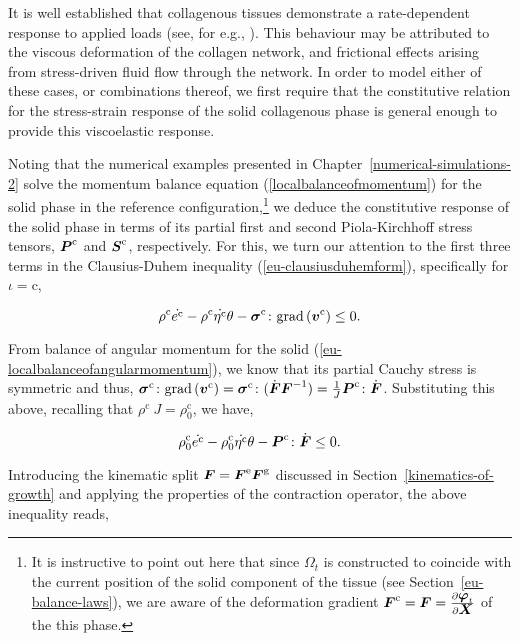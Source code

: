 It is well established that collagenous tissues demonstrate a
rate-dependent response to applied loads (see, for e.g.,
\citet{Provenzanoetal:2001}). This behaviour may be attributed to the
viscous deformation of the collagen network, and frictional effects
arising from stress-driven fluid flow through the network. In order to
model either of these cases, or combinations thereof, we first require
that the constitutive relation for the stress-strain response of the
solid collagenous phase is general enough to provide this viscoelastic
response.

Noting that the numerical examples presented in
Chapter~\ref{numerical-simulations-2} solve the momentum balance
equation (\ref{localbalanceofmomentum}) for the solid phase in the
reference configuration,\footnote{It is instructive to point out here
  that since $\Omega_{t}$ is constructed to coincide with the current
  position of the solid component of the tissue (see
  Section~\ref{eu-balance-laws}), we are aware of the deformation
  gradient $\mbox{\boldmath$ F$}^{\mathrm{c}}=\mbox{\boldmath$ F$}=\frac{\partial \mbox{\boldmath$\varphi$}_{t}}{\partial
    \mbox{\boldmath$ X$}}$ of the this phase.} we deduce the constitutive response of
the solid phase in terms of its partial first and second
Piola-Kirchhoff stress tensors, $\mbox{\boldmath$ P$}^{\mathrm{c}}$ and
$\mbox{\boldmath$ S$}^{\mathrm{c}}$, respectively. For this, we turn our attention to
the first three terms in the Clausius-Duhem inequality
(\ref{eu-clausiusduhemform}), specifically for $\iota=\mathrm{c}$,

\begin{equation*}
\rho^{\mathrm{c}} \dot{e^{\mathrm{c}}}
- \rho^{\mathrm{c}} \dot{\eta^{\mathrm{c}}} \theta
-\mbox{\boldmath$\sigma$}^{\mathrm{c}}\colon\mathrm{grad}\left(\mbox{\boldmath$ v$}^{\mathrm{c}}\right)\leq 0.
\end{equation*}

\noindent From balance of angular momentum for the solid
(\ref{eu-localbalanceofangularmomentum}), we know that its partial
Cauchy stress is symmetric and thus,
$\mbox{\boldmath$\sigma$}^{\mathrm{c}}\colon\mathrm{grad}\left(\mbox{\boldmath$ v$}^{\mathrm{c}}\right)
=\mbox{\boldmath$\sigma$}^{\mathrm{c}}\colon(\dot{\mbox{\boldmath$ F$}}\mbox{\boldmath$ F$}^{-1})
=\frac{1}{J}\mbox{\boldmath$ P$}^{\mathrm{c}}\colon\dot{\mbox{\boldmath$ F$}}$. Substituting this above,
recalling that \mbox{$\rho^{\mathrm{c}}\ J=\rho_0^{\mathrm{c}}$}, we
have,

\begin{equation*}
\rho_{0}^{\mathrm{c}} \dot{e^{\mathrm{c}}}
- \rho_{0}^{\mathrm{c}} \dot{\eta^{\mathrm{c}}} \theta
-\mbox{\boldmath$ P$}^{\mathrm{c}}\colon\dot{\mbox{\boldmath$ F$}}\leq 0.
\end{equation*}

Introducing the kinematic split $\mbox{\boldmath$ F$}=\mbox{\boldmath$ F$}^{\mathrm{e}}\mbox{\boldmath$ F$}^{\mathrm{g}}$
discussed in Section~\ref{kinematics-of-growth} and applying the
properties of the contraction operator, the above inequality reads,

